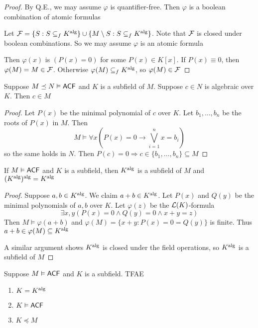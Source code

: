 \documentclass[11pt]{article}
\begin{document}
\begin{proof}
By Q.E., we may assume \(\varphi\) is quantifier-free. Then \(\varphi\) is a boolean combination of atomic formulas

Let \(\mathcal{F}=\{S:S\subseteq_fK^{\operatorname{\text{alg}}}\}\cup\{M\setminus S:S\subseteq_fK^{\operatorname{\text{alg}}}\}\). Note that \(\mathcal{F}\) is closed under boolean
combinations. So we may assume \(\varphi\) is an atomic formula

Then \(\varphi(x)\) is \((P(x)=0)\) for some \(P(x)\in K[x]\). If \(P(x)\equiv 0\), then \(\varphi(M)=M\in\mathcal{F}\).
Otherwise \(\varphi(M)\subseteq_fK^{\operatorname{\text{alg}}}\), so \(\varphi(M)\in\mathcal{F}\)
\end{proof}

\begin{lemma}[]
\label{34}
Suppose \(M\preceq N\vDash\textsf{ACF}\) and \(K\) is a subfield of \(M\). Suppose \(c\in N\) is algebraic
over \(K\). Then \(c\in M\)
\end{lemma}

\begin{proof}
Let \(P(x)\) be the minimal polynomial of \(c\) over \(K\). Let \(b_1,\dots,b_n\) be the roots
of \(P(x)\) in \(M\). Then
\begin{equation*}
M\vDash\forall x\left( P(x)=0\to\bigvee_{i=1}^nx=b_i \right)
\end{equation*}
so the same holds in \(N\). Then \(P(c)=0\Rightarrow c\in\{b_1,\dots,b_n\}\subseteq M\)
\end{proof}

\begin{theorem}[]
If \(M\vDash\textsf{ACF}\) and \(K\) is a subfield, then \(K^{\operatorname{\text{alg}}}\) is a subfield of \(M\) and \((K^{\operatorname{\text{alg}}})^{\operatorname{\text{alg}}}=K^{\operatorname{\text{alg}}}\)
\end{theorem}

\begin{proof}
Suppose \(a,b\in K^{\operatorname{\text{alg}}}\). We claim \(a+b\in K^{\operatorname{\text{alg}}}\). Let \(P(x)\) and \(Q(y)\) be the minimal
polynomials of \(a,b\) over \(K\). Let \(\varphi(z)\) be the \(\mathcal{L}(K)\)-formula
\begin{equation*}
\exists x,y(P(x)=0\wedge Q(y)=0\wedge x+y=z)
\end{equation*}
Then \(M\vDash\varphi(a+b)\) and \(\varphi(M)=\{x+y:P(x)=0=Q(y)\}\) is finite. Thus \(a+b\in\varphi(M)\subseteq K^{\operatorname{\text{alg}}}\)

A similar argument shows \(K^{\operatorname{\text{alg}}}\) is closed under the field operations, so \(K^{\operatorname{\text{alg}}}\) is a
subfield of \(M\)
\end{proof}

\begin{theorem}[]
Suppose \(M\vDash\textsf{ACF}\) and \(K\) is a subfield. TFAE
\begin{enumerate}
\item \(K=K^{\operatorname{\text{alg}}}\)
\item \(K\vDash\textsf{ACF}\)
\item \(K\preceq M\)
\end{enumerate}
\end{theorem}
\end{document}

